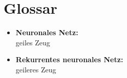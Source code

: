 \chapter{Glossar} 
\label{ch:glossar}
	\begin{itemize}
		\item \textbf{Neuronales Netz:}\\
		geiles Zeug
		\item \textbf{Rekurrentes neuronales Netz:}\\
		geileres Zeug
	
	\end{itemize}